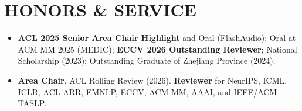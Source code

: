 \documentclass[10pt,letterpaper]{article}
\begin{document}
\section{HONORS \& SERVICE}
\begin{itemize}
  \item \textbf{ACL 2025 Senior Area Chair Highlight} and Oral (FlashAudio); Oral at ACM MM 2025 (MEDIC); \textbf{ECCV 2026 Outstanding Reviewer}; National Scholarship (2023); Outstanding Graduate of Zhejiang Province (2024).
  \item \textbf{Area Chair}, ACL Rolling Review (2026). \textbf{Reviewer} for NeurIPS, ICML, ICLR, ACL ARR, EMNLP, ECCV, ACM MM, AAAI, and IEEE/ACM TASLP.
\end{itemize}
\end{document}
